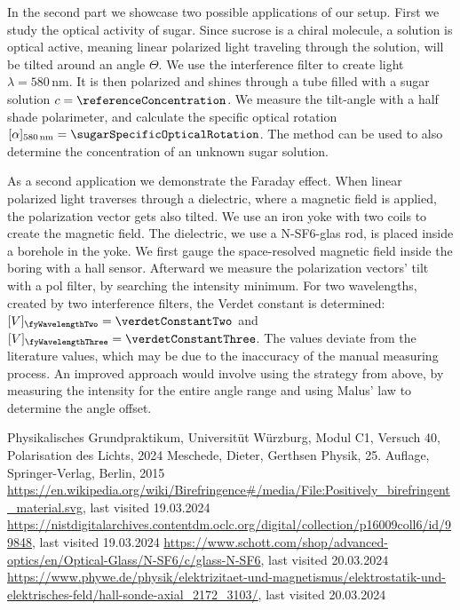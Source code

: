 \documentclass[a4paper,10pt,twocolumn]{article}
\newcommand{\NSF}{N-SF6}
\newcommand{\VTwo}{[V]_{\fyWavelengthTwo}}
\newcommand{\VThree}{[V]_{\fyWavelengthThree}}
\newcommand{\unit}[1]{\, \mathrm{#1}}
\newcommand{\nm}{\unit{nm}}
\newcommand{\wavelengthYellow}{580 \nm}
\newcommand{\specRot}{[\alpha]_{\wavelengthYellow}}
\begin{document}
    In the second part we showcase two possible applications of our setup.
    First we study the optical activity of sugar.
    Since sucrose is a chiral molecule, a solution is optical active, meaning linear polarized light
    traveling through the solution, will be tilted around an angle $\Theta$.
    We use the interference filter to create light $\lambda = \wavelengthYellow$.
    It is then polarized and shines through a tube filled with a sugar solution $c = \referenceConcentration$.
    We measure the tilt-angle with a half shade polarimeter, and calculate the specific optical rotation
    $\specRot = \sugarSpecificOpticalRotation$.
    The method can be used to also determine the concentration of an unknown sugar solution.
    
    As a second application we demonstrate the Faraday effect.
    When linear polarized light traverses through a dielectric, where a magnetic field is applied, the
    polarization vector gets also tilted.
    We use an iron yoke with two coils to create the magnetic field.
    The dielectric, we use a \NSF-glas rod, is placed inside a borehole in the yoke.
    We first gauge the space-resolved magnetic field inside the boring with a hall sensor.
    Afterward we measure the polarization vectors' tilt with a pol filter, by searching the intensity minimum.
    For two wavelengths, created by two interference filters, the Verdet constant is determined:
     $\VTwo = \verdetConstantTwo$ and $\VThree = \verdetConstantThree$.
    The values deviate from the literature values, which may be due to the inaccuracy of the manual
    measuring process.
    An improved approach would involve using the strategy from above, by measuring the intensity for the entire
    angle range and using Malus' law to determine the angle offset.
    
    
    \begin{thebibliography}{}    %
         Physikalisches Grundpraktikum, Universitüt Würzburg, Modul C1, Versuch 40, Polarisation des Lichts, 2024
         Meschede, Dieter, Gerthsen Physik, 25. Auflage, Springer-Verlag, Berlin, 2015
         \url{https://en.wikipedia.org/wiki/Birefringence#/media/File:Positively_birefringent_material.svg}, last visited 19.03.2024
         \url{https://nistdigitalarchives.contentdm.oclc.org/digital/collection/p16009coll6/id/99848}, last visited 19.03.2024
         \url{https://www.schott.com/shop/advanced-optics/en/Optical-Glass/N-SF6/c/glass-N-SF6}, last visited 20.03.2024 
         \url{https://www.phywe.de/physik/elektrizitaet-und-magnetismus/elektrostatik-und-elektrisches-feld/hall-sonde-axial_2172_3103/}, last visited 20.03.2024
    \end{thebibliography}
    
\end{document}
